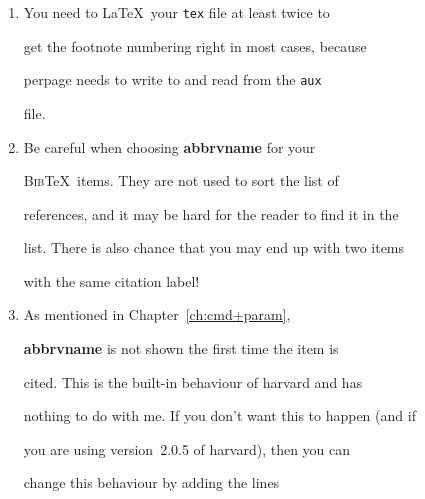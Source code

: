 \documentclass{bhamthesis}
\providecommand{\BibTeX}{\textsc{Bib}\TeX}
\newcommand{\bksl}{\char`\\}
\newcommand{\cmd}[1]{\texttt{\bksl{}#1}}
\newcommand{\pkg}[1]{\textsf{#1}}
\newcommand{\env}[1]{\texttt{#1}}
\newcommand{\ext}[1]{\texttt{#1}}
\newcommand{\bfield}[1]{\textbf{#1}}
\begin{document}
\begin{enumerate}
  sneak onto a separate page without your permission.  So you need

  to check them as well if you don't want that the happen.  You

  can also increase \cmd{floatpagefraction} so that only floats

  occupying at least that proportion of height on the page go on a

  separate page.  Note that more than one small floats may make up

  enough height to go onto a new page on their own.

  \cmd{floatpagefraction} is set to $0.5$ initially by \LaTeX.  You

  can increase it up to $0.99999237$, correct to $8$~decimal places,

  before it affects \env{figurepage} and \env{tablepage}.

\item You need to \LaTeX\ your \ext{tex} file at least twice to

  get the footnote numbering right in most cases, because

  \pkg{perpage} needs to write to and read from the \ext{aux}

  file.

\item Be careful when choosing \bfield{abbrvname} for your

  \BibTeX\ items.  They are not used to sort the list of

  references, and it may be hard for the reader to find it in the

  list.  There is also chance that you may end up with two items

  with the same citation label!

\item As mentioned in Chapter~\ref{ch:cmd+param},

  \bfield{abbrvname} is not shown the first time the item is

  cited.  This is the built-in behaviour of \pkg{harvard} and has

  nothing to do with me.  If you don't want this to happen (and if

  you are using version~2.0.5 of \pkg{harvard}), then you can

  change this behaviour by adding the lines

  \begingroup

   \footnotesize


\end{enumerate}
\end{document}
